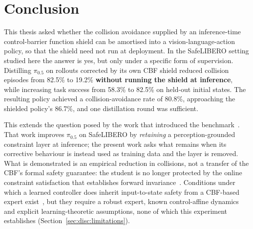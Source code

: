 %
%
%
%

\chapter{Conclusion}\label{ch:conclusion}
\label{sec:conc}

This thesis asked whether the collision avoidance supplied by an inference-time control-barrier
function shield can be amortised into a vision-language-action policy, so that the shield need not
run at deployment. In the SafeLIBERO setting studied here the answer is yes, but only under a
specific form of supervision. Distilling $\pi_{0.5}$ on rollouts corrected by its own CBF shield
reduced collision episodes from 82.5\% to 19.2\% \textbf{without running the shield at inference},
while increasing task success from 58.3\% to 82.5\% on held-out initial states. The resulting
policy achieved a collision-avoidance rate of 80.8\%, approaching the shielded policy's 86.7\%, and
one distillation round was sufficient.

This extends the question posed by the work that introduced the benchmark~\cite{vlsa2026}. That
work improves $\pi_{0.5}$ on SafeLIBERO by \emph{retaining} a perception-grounded constraint layer
at inference; the present work asks what remains when its corrective behaviour is instead used as
training data and the layer is removed. What is demonstrated is an empirical reduction in
collisions, not a transfer of the CBF's formal safety guarantee: the student is no longer protected
by the online constraint satisfaction that establishes forward invariance~\cite{ames2017cbf}.
Conditions under which a learned controller does inherit input-to-state safety from a CBF-based
expert exist~\cite{cosner2022il_cbf}, but they require a robust expert, known control-affine
dynamics and explicit learning-theoretic assumptions, none of which this experiment establishes
(Section~\ref{sec:disc:limitations}).

